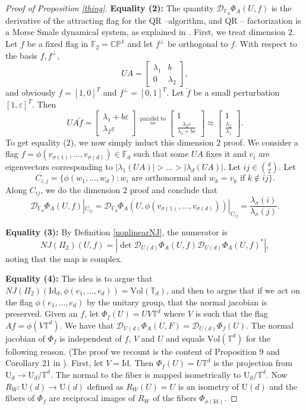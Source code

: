 \documentclass[10pt]{amsart}
\numberwithin{equation}{section}     %
\newcommand{\T}{\mathbb{T}}
\newcommand{\cD}{\mathcal{D}}\newcommand{\cE}{\mathcal{E}}\newcommand{\cF}{\mathcal{F}}
\newcommand{\CP}{\mathbb{CP}}
\newcommand{\FF}{\mathbb{F}}
\newcommand{\U}{\mathrm{U}}
\renewcommand{\epsilon}{\varepsilon}
\begin{document}
\begin{proof}[Proof of Proposition \ref{thing}]
\noindent \textbf{Equality (2):} The quantity $\cD_{\FF_d}\Phi_A(U,f)$ is the derivative of the attracting flag for the QR --algorithm, and QR -- factorization is a Morse Smale dynamical system, as explained in \cite{shub1987g}. First, we treat dimension $2$. Let $f$ be a fixed flag in $\FF_2 = \CP^1$ and let $f^\perp$ be orthogonal to $f$. With respect to the basis $f, f^\perp$,$$ UA = \begin{bmatrix}
    \lambda_1 & b \\
    0 & \lambda_2
\end{bmatrix},$$ and obviously $f = [1,0]^T$ and $f^\perp = [0,1]^T$. Let $\tilde{f}$ be a small perturbation $[1,\epsilon]^T$. Then $$UA\tilde{f} = \begin{bmatrix}
    \lambda_1 + b\epsilon \\
    \lambda_2 \epsilon \end{bmatrix}\overset{\text{parallel to}}{=} 
    \begin{bmatrix}
        1 \\
       \frac{\lambda_2 \epsilon}{\lambda_1 + b\epsilon}
    \end{bmatrix}
    \approx 
    \begin{bmatrix}
        1 \\
       \frac{\lambda_2 }{\lambda_1 }
    \end{bmatrix}.
$$
To get equality (2), we now simply induct this dimension $2$ proof. We consider a flag $f = \phi(v_{\sigma(1)},...,v_{\sigma(d)}) \in \FF_d$ such that some $UA$ fixes it and $v_i$ are eigenvectors corresponding to $|\lambda_1(UA)| > \dots > |\lambda_d(UA)|$. Let $ij \in \binom{d}{2}$. Let $$C_{i,j} = \{\phi(w_1,...,w_d): w_i \text{ are orthonormal and } w_k = v_k \text{ if } k \notin ij \}.$$ Along $C_{ij}$, we do the dimension $2$ proof and conclude that $$\cD_{\FF_d}\Phi_A(U,f)|_{C_{ij}} =\cD_{\FF_d}\Phi_A(U, \phi(v_{\sigma(1)},...,v_{\sigma(d)}))|_{C_{ij}}  = \frac{\lambda_\sigma(i)}{\lambda_\sigma(j)}.$$

\noindent \textbf{Equality (3): } 
By Definition \ref{nonlinearNJ}, the numerator is $$NJ(\Pi_2)(U,f) = |\det \cD_{U(d)} \Phi_A(U,f) \cD_{U(d)} \Phi_A(U,f)^*|,$$ noting that the map is complex. 

\noindent \textbf{Equality (4): } 
The idea is to argue that $NJ(\Pi_2)(\mathrm{Id}_d, \phi(e_1,...,e_d)) = \mathrm{Vol}(\T_d)$, and then to argue that if we act on the flag $\phi(e_1,\dots,e_d)$ by the unitary group, that the normal jacobian is preserved. 
Given an $f$, let $\Phi_f(U) = UV\T^d$ where $V$ is such that the flag $Af = \phi(V\T^d). $
We have that $\cD_{U(d)}\Phi_A(U,F) = \cD_{U(d)}\Phi_{f}(U).$ The normal jacobian of $\Phi_f$ is independent of $f$, $V$ and $U$ and equals $\mathrm{Vol} (\T^d)$ for the following reason. (The proof we recount is the content of Proposition 9 and Corollary 21 in \cite{dedieu2003mike}). First, let $V = \mathrm{Id}.$ Then $\Phi_f(U) = U\mathbb{T}^d$ is the projection from $\U_d \to \U_d/\T^d.$ The normal to the fiber is mapped isometrically to $\U_d / \T^d.$ Now $R_W:\U(d) \to \U(d)$  defined as $R_W(U) = U$ is an isometry of $\U(d)$ and the fibers of $\Phi_f$ are reciprocal images of $R_W$ of the fibers $\Phi_{\phi(\mathrm{Id})}$. 


\end{proof}
\end{document}
